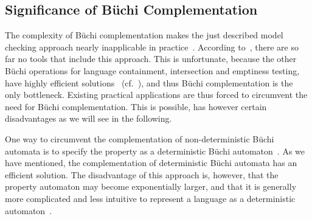 

\subsection{Significance of Büchi Complementation}
The complexity of Büchi complementation makes the just described model checking approach nearly inapplicable in practice~\cite{1995_tasiran}. According to~\cite{2007_vardi_model_checking}, there are so far no tools that include this approach. This is unfortunate, because the other Büchi operations for language containment, intersection and emptiness testing, have highly efficient solutions~\cite{2007_vardi_model_checking} (cf.~\cite{1996_vardi}), and thus Büchi complementation is the only bottleneck. Existing practical applications are thus forced to circumvent the need for Büchi complementation. This is possible, has however certain disadvantages as we will see in the following.

One way to circumvent the complementation of non-deterministic Büchi automata is to specify the property as a deterministic Büchi automaton~\cite{1995_tasiran}\cite{2007_vardi_model_checking}. As we have mentioned, the complementation of deterministic Büchi automata has an efficient solution. The disadvantage of this approach is, however, that the property automaton may become exponentially larger, and that it is generally more complicated and less intuitive to represent a language as a deterministic automaton~\cite{1995_tasiran}.


